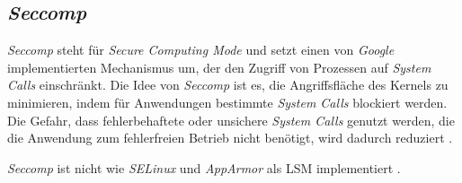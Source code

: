 \documentclass[../main.tex]{subfiles}
\begin{document}




    \subsection{\emph{Seccomp}}
		\label{seccomp}


			\emph{Seccomp} steht für \emph{Secure Computing Mode} und setzt einen von \emph{Google} implementierten Mechanismus um, der den Zugriff von Prozessen auf \emph{System Calls} einschränkt. Die Idee von \emph{Seccomp} ist es, die Angriffsfläche des Kernels zu minimieren, indem für Anwendungen bestimmte \emph{System Calls}  blockiert werden. Die Gefahr, dass fehlerbehaftete oder unsichere \emph{System Calls} genutzt werden, die die Anwendung zum fehlerfreien Betrieb nicht benötigt, wird dadurch reduziert \cite{linuxSecOverview}\cite{seccompGitDesc}\cite{secInFuture}.

			\emph{Seccomp} ist nicht wie \emph{SELinux} und \emph{AppArmor} als LSM implementiert \cite{seccompLWN}.
\end{document}
